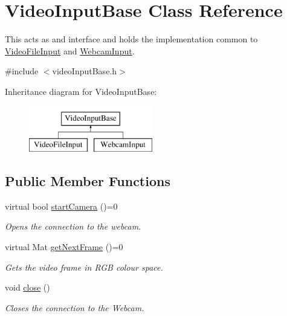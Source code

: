 \hypertarget{class_video_input_base}{}\section{Video\+Input\+Base Class Reference}
\label{class_video_input_base}


This acts as and interface and holds the implementation common to \hyperlink{class_video_file_input}{Video\+File\+Input} and \hyperlink{class_webcam_input}{Webcam\+Input}.  




{\ttfamily \#include $<$video\+Input\+Base.\+h$>$}

Inheritance diagram for Video\+Input\+Base\+:\begin{figure}[H]
\begin{center}
\leavevmode
\includegraphics[height=2.000000cm]{class_video_input_base}
\end{center}
\end{figure}
\subsection*{Public Member Functions}
\begin{DoxyCompactItemize}
\item 
virtual bool \hyperlink{class_video_input_base_aff0dba9ff7bebd2d6d3fe55bc6f1c0c0}{start\+Camera} ()=0
\begin{DoxyCompactList}\small\item\em Opens the connection to the webcam. \end{DoxyCompactList}\item 
virtual Mat \hyperlink{class_video_input_base_a2d289ea71410a736496a180363e219b4}{get\+Next\+Frame} ()=0
\begin{DoxyCompactList}\small\item\em Gets the video frame in R\+G\+B colour space. \end{DoxyCompactList}\item 
\hypertarget{class_video_input_base_af2d32b5797e19abe6f1084f81f29554b}{}void \hyperlink{class_video_input_base_af2d32b5797e19abe6f1084f81f29554b}{close} ()\label{class_video_input_base_af2d32b5797e19abe6f1084f81f29554b}

\begin{DoxyCompactList}\small\item\em Closes the connection to the Webcam. \end{DoxyCompactList}\end{DoxyCompactItemize}
